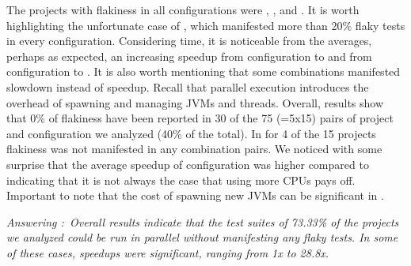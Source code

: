 The projects with flakiness
in all configurations were , , and
.  It is worth highlighting the unfortunate case of
, which manifested more than 20\% flaky tests in
every configuration.  Considering time, it is noticeable from the
averages, perhaps as expected, an increasing speedup from
configuration \emph{\SeqClassParMeth} to \emph{\ParClassParMeth} and
from configuration \emph{\ForkSeq} to \emph{\ForkParMeth}.  It is also
worth mentioning that some combinations manifested slowdown instead of
speedup.  Recall that parallel execution introduces the overhead of
spawning and managing JVMs and threads.  Overall, results show that
0\% of flakiness have been reported in 30 of the 75 (=5x15)
pairs of project and configuration we analyzed (40\% of the total).
In for 4 of the 15 projects flakiness was not manifested in 
any combination pairs.  We noticed with some surprise that the average speedup of
configuration \emph{\SeqClassParMeth} was higher compared to
\emph{\ForkParMeth} indicating that it is not always the case that
using more CPUs pays off. Important to note that the cost of spawning
new JVMs can be significant in \emph{\ForkParMeth}.

\begin{mdframed}
\noindent\textit{Answering \numRQIssuesOne{}:~Overall results indicate that the
  test suites of 73.33\% of the projects we analyzed could be run in
  parallel without manifesting any flaky tests.  In some of these
  cases, speedups were significant, ranging from 1x to 28.8x.}
\end{mdframed}

